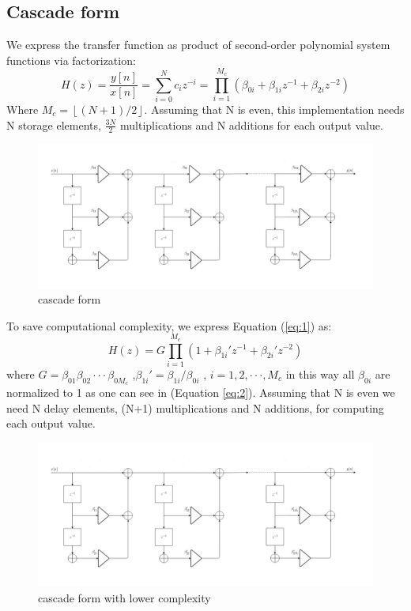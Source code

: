 \subsection{Cascade form}
We express the transfer function as product of second-order polynomial system functions via factorization:
\begin{equation} \label{eq:1}
H(z)=\frac{y[n]}{x[n]} =\sum_{i=0}^{N}c_{i}z^{-i}= \prod_{i=1}^{M_{c}}(\beta_{0i}+\beta_{1i}z^{-1}+\beta_{2i}z^{-2})
\end{equation}
Where $M_{c}= \left \lfloor (N+1)/2 \right \rfloor$.
Assuming that N is even, this implementation needs N storage elements, $\frac{3N}{2}$ multiplications and N additions for each output value.
\begin{figure}[H]
    \centering
    \includegraphics[scale=0.35]{images/cascade.jpg}    
    \caption{cascade form}
    \label{fig:cascade}
\end{figure}
To save computational complexity, we express Equation (\ref{eq:1}) as:
\begin{equation} \label{eq:2}
H(z)= G\prod_{i=1}^{M_{c}}(1+\beta_{1i}'z^{-1}+\beta_{2i}'z^{-2})
\end{equation}
where $G=\beta_{01}\beta_{02} \cdot\cdot\cdot\beta_{0M_{c}}$ ,$\beta_{1i}'=\beta_{1i}/\beta_{0i}$ , $i= 1,2,\cdot \cdot \cdot,M_{c}$ in this way all $\beta_{0i}$ are normalized to 1 as one can see in (Equation \ref{eq:2}). Assuming that N is even we need N delay elements, (N+1) multiplications and N additions, for computing each output value.
\begin{figure}[H]
    \centering
    \includegraphics[scale=0.35]{images/cascadeoptimised.jpg}    
    \caption{cascade form with lower complexity}
    \label{fig:cascade_opt}
\end{figure}
